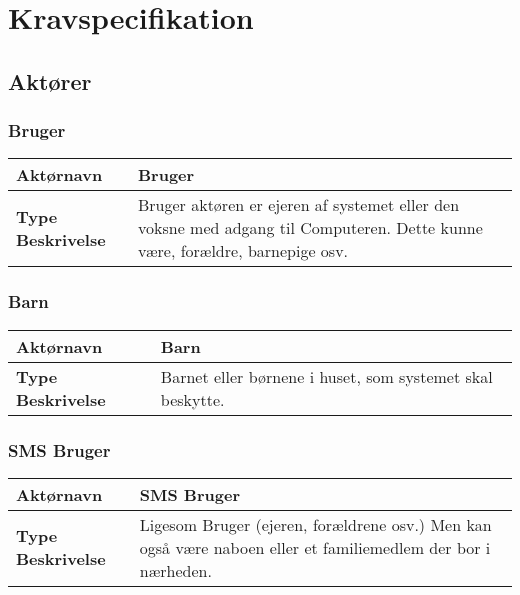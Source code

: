 \chapter{Kravspecifikation}

\section{Aktører}

\subsection{Bruger}
\begin{table}[htbp] \centering
\begin{tabular}{|p{4cm}|p{7cm}|}
	\hline
\textbf{Aktørnavn} &Bruger \\\hline
\textbf{Type Beskrivelse} &
Bruger aktøren er ejeren af systemet eller den voksne med adgang til Computeren.
Dette kunne være, forældre, barnepige osv.	
\\\hline
	\end{tabular}
\end{table}

\subsection{Barn}
\begin{table}[htbp] \centering
\begin{tabular}{|p{4cm}|p{7cm}|}
	\hline
\textbf{Aktørnavn} &Barn \\\hline
\textbf{Type Beskrivelse} &
Barnet eller børnene i huset, som systemet skal beskytte.	
\\\hline
	\end{tabular}
\end{table}

\subsection{SMS Bruger}
\begin{table}[htbp] \centering
\begin{tabular}{|p{4cm}|p{7cm}|}
	\hline
\textbf{Aktørnavn} &SMS Bruger \\\hline
\textbf{Type Beskrivelse} &
Ligesom Bruger (ejeren, forældrene osv.)
Men kan også være naboen eller et familiemedlem der bor i nærheden.
\\\hline
	\end{tabular}
\end{table}

